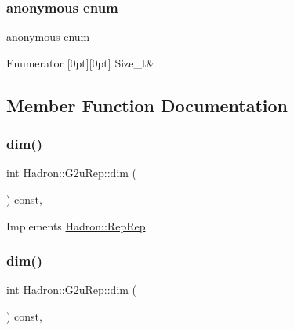 \subsubsection{\texorpdfstring{anonymous enum}{anonymous enum}}
{\footnotesize\ttfamily anonymous enum}

\begin{DoxyEnumFields}{Enumerator}
[0pt][0pt]{}\mbox{\label{structHadron_1_1G2uRep_a995e1c4b234da5e51de711722a6343afacfcbaaee9e10a4f3453542af7bd77599}} 
Size\+\_\+t&\\
\hline

\end{DoxyEnumFields}


\subsection{Member Function Documentation}
\mbox{\label{structHadron_1_1G2uRep_a1cfbf4340498e3300f5d921ed683dea8}} 
\subsubsection{\texorpdfstring{dim()}{dim()}\hspace{0.1cm}{\footnotesize\ttfamily [1/3]}}
{\footnotesize\ttfamily int Hadron\+::\+G2u\+Rep\+::dim (\begin{DoxyParamCaption}{ }\end{DoxyParamCaption}) const\hspace{0.3cm}{\ttfamily [inline]}, {\ttfamily [virtual]}}



Implements \mbox{\hyperlink{structHadron_1_1RepRep_a92c8802e5ed7afd7da43ccfd5b7cd92b}{Hadron\+::\+Rep\+Rep}}.

\mbox{\label{structHadron_1_1G2uRep_a1cfbf4340498e3300f5d921ed683dea8}} 
\subsubsection{\texorpdfstring{dim()}{dim()}\hspace{0.1cm}{\footnotesize\ttfamily [2/3]}}
{\footnotesize\ttfamily int Hadron\+::\+G2u\+Rep\+::dim (\begin{DoxyParamCaption}{ }\end{DoxyParamCaption}) const\hspace{0.3cm}{\ttfamily [inline]}, {\ttfamily [virtual]}}



